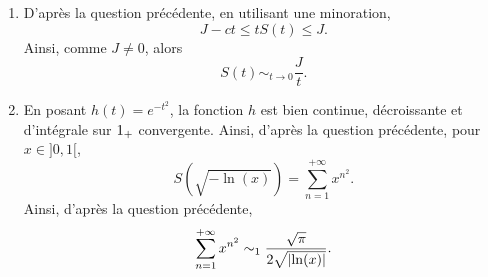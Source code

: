 \begin{preuve}
\begin{enumerate}
\item D'après la question précédente, en utilisant une minoration,
\[
J - c t \leq t S(t) \leq J.
\]
Ainsi, comme $J \neq 0$, alors
\[
S(t) \sim_{t\to0} \frac{J}{t}.
\]

\item En posant $h(t) = e^{-t^2}$, la fonction $h$ est bien continue, décroissante et d'intégrale sur $1_+$ convergente. Ainsi, d'après la question précédente, pour $x \in ]0, 1[$,
\[
S(\sqrt{-\ln(x)}) = \sum_{n=1}^{+\infty} x^{n^2}.
\]
Ainsi, d'après la question précédente,
\[
\sum_{n=1}^{+\infty} x^{n^2} \sim_1 \frac{\sqrt{\pi}}{2 \sqrt{\abs{\ln(x)}}}.
\]
\end{enumerate}
\end{preuve}
